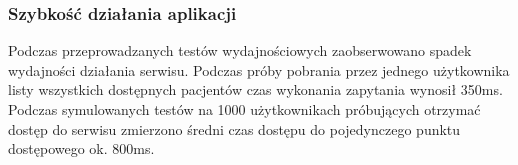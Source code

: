 \subsubsection{Szybkość działania aplikacji}
Podczas przeprowadzanych testów wydajnościowych zaobserwowano spadek wydajności działania serwisu. Podczas próby pobrania przez jednego użytkownika listy wszystkich dostępnych pacjentów czas wykonania zapytania wynosił 350ms. Podczas symulowanych testów na 1000 użytkownikach próbujących otrzymać dostęp do serwisu zmierzono średni czas dostępu do pojedynczego punktu dostępowego ok. 800ms. 